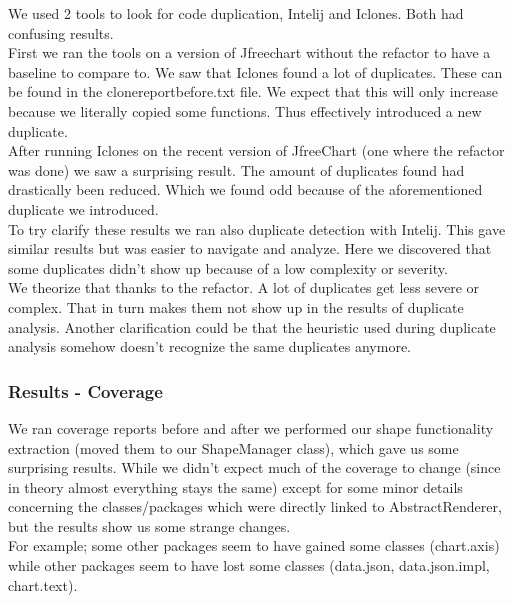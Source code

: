 \documentclass{article}
\begin{document}
We used 2 tools to look for code duplication, Intelij and Iclones. Both had confusing results.\\

First we ran the tools on a version of Jfreechart without the refactor to have a baseline to compare to. We saw that Iclones found a lot of duplicates. These can be found in the clonereportbefore.txt file. We expect that this will only increase because we literally copied some functions. Thus effectively introduced a new duplicate.\\

After running Iclones on the recent version of JfreeChart (one where the refactor was done) we saw a surprising result. The amount of duplicates found had drastically been reduced. Which we found odd because of the aforementioned duplicate we introduced.\\

To try clarify these results we ran also duplicate detection with Intelij. This gave similar results but was easier to navigate and analyze. Here we discovered that some duplicates didn't show up because of a low complexity or severity.\\

We theorize that thanks to the refactor. A lot of duplicates get less severe or complex. That in turn makes them not show up in the results of duplicate analysis. Another clarification could be that the heuristic used during duplicate analysis somehow doesn't recognize the same duplicates anymore.\\
\subsubsection{Results - Coverage}

We ran coverage reports before and after we performed our shape functionality extraction (moved them to our ShapeManager class), which gave us some surprising results. While we didn't expect much of the coverage to change (since in theory almost everything stays the same) except for some minor details concerning the classes/packages which were directly linked to AbstractRenderer, but the results show us some strange changes.\\

For example; some other packages seem to have gained some classes (chart.axis) while other packages seem to have lost some classes (data.json, data.json.impl, chart.text).
\end{document}
